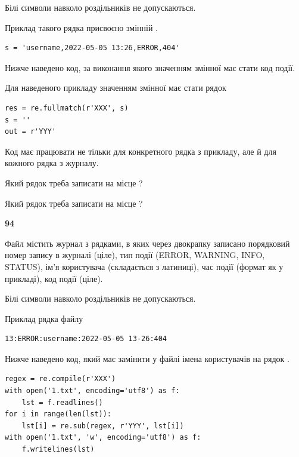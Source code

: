 Білі символи навколо роздільників не допускаються.

Приклад такого рядка присвоєно змінній .



\begin{verbatim}
s = 'username,2022-05-05 13:26,ERROR,404'
\end{verbatim}


Нижче наведено код, за виконання якого значенням змінної  має стати код події.

Для наведеного прикладу значенням змінної  має стати рядок 



\begin{verbatim}
res = re.fullmatch(r'XXX', s)
s = ''
out = r'YYY'
\end{verbatim}


Код має працювати не тільки для конкретного рядка з прикладу, але й для кожного рядка з журналу.




Який рядок треба записати на місце  ?\par
\vspace{5mm}


Який рядок треба записати на місце  ?\par


\newpage

{\begin {center}\textbf{ 94}\end {center}}\par
Файл  містить журнал з рядками, в яких через двокрапку записано поряд\-ко\-вий номер запису в журналі (ціле), тип події (ERROR, WARNING, INFO, STATUS), ім'я користувача (складається з латиниці), час події (фор\-мат як у прикладі), код події (ціле).

Білі символи навколо роздільників не допускаються.

Приклад рядка файлу



\begin{verbatim}
13:ERROR:username:2022-05-05 13-26:404
\end{verbatim}


Нижче наведено код, який має замінити у файлі імена користувачів на рядок .



\begin{verbatim}
regex = re.compile(r'XXX')
with open('1.txt', encoding='utf8') as f:
    lst = f.readlines()
for i in range(len(lst)):
    lst[i] = re.sub(regex, r'YYY', lst[i])
with open('1.txt', 'w', encoding='utf8') as f:
    f.writelines(lst)
\end{verbatim}







